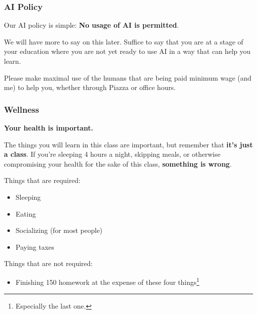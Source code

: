 \documentclass[aspectratio=169, handout]{beamer}
\begin{document}
\begin{frame}[fragile]
  \frametitle{AI Policy}

  Our AI policy is simple: \textbf{No usage of AI is permitted}.

  \pause
  \vspace{\fill}

  We will have more to say on this later. Suffice to say that you are at a
  stage of your education where you are not yet ready to use AI in a way that
  can help you learn.

  \pause
  \vspace{\fill}

  Please make maximal use of the humans that are being paid minimum wage (and me)
  to help you, whether through Piazza or office hours.
\end{frame}



\begin{frame}[fragile]
  \frametitle{Wellness}

  \textbf{Your health is important.}

  \pause
  \vspace{\fill}

  The things you will learn in this class are important, but remember that
  \textbf{it's just a class}. If you're sleeping 4 hours a night, skipping meals,
  or otherwise compromising your health for the sake of this class, \textbf{something
  is wrong}.

  \pause
  \vspace{\fill}

  Things that are required:
  \begin{itemize}
    \item Sleeping \pause
    \item Eating \pause
    \item Socializing (for most people) \pause
    \item Paying taxes
  \end{itemize}

  \pause
  \vspace{\fill}

  Things that are not required:
  \begin{itemize}
    \item Finishing 150 homework at the expense of these four things\footnote{Especially the last one.}
  \end{itemize}
\end{frame}
\end{document}
